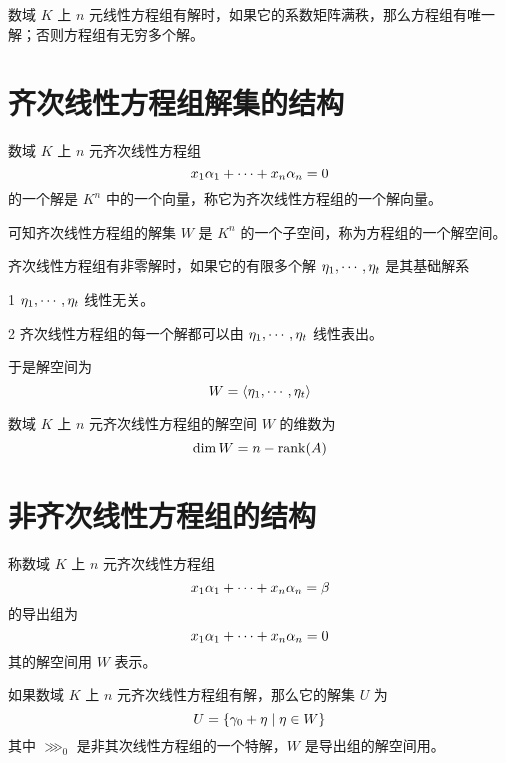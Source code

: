 \begin{theorem}
	数域 $K$ 上 $n$ 元线性方程组有解时，如果它的系数矩阵满秩，那么方程组有唯一解；否则方程组有无穷多个解。
\end{theorem}

\section{齐次线性方程组解集的结构}

数域 $K$ 上 $n$ 元齐次线性方程组
\[x_1\alpha_1 + \cdots + x_n\alpha_n = 0\]
的一个解是 $K^n$ 中的一个向量，称它为齐次线性方程组的一个解向量。

可知齐次线性方程组的解集 $W$ 是 $K^n$ 的一个子空间，称为方程组的一个解空间。

\begin{definition}
	齐次线性方程组有非零解时，如果它的有限多个解 $\eta_1,\cdots,\eta_t$ 是其基础解系

	\num{1} $\eta_1,\cdots,\eta_t$ 线性无关。

	\num{2} 齐次线性方程组的每一个解都可以由 $\eta_1,\cdots,\eta_t$ 线性表出。
\end{definition}

于是解空间为
\[W = \langle \eta_1,\cdots,\eta_t \rangle\]

\begin{theorem}
	数域 $K$ 上 $n$ 元齐次线性方程组的解空间 $W$ 的维数为
	\[\dim W = n-\operatorname{rank}(A)\]
\end{theorem}

\section{非齐次线性方程组的结构}

称数域 $K$ 上 $n$ 元齐次线性方程组
\[x_1\alpha_1 + \cdots + x_n\alpha_n = \beta\]
的导出组为
\[x_1\alpha_1 + \cdots + x_n\alpha_n = 0\]
其的解空间用 $W$ 表示。

\begin{theorem}
	如果数域 $K$ 上 $n$ 元齐次线性方程组有解，那么它的解集 $U$ 为
	\[U = \{\gamma_0+\eta \mid \eta \in W\}\]
	其中 $\ggg_0$ 是非其次线性方程组的一个特解，$W$ 是导出组的解空间用。
\end{theorem}